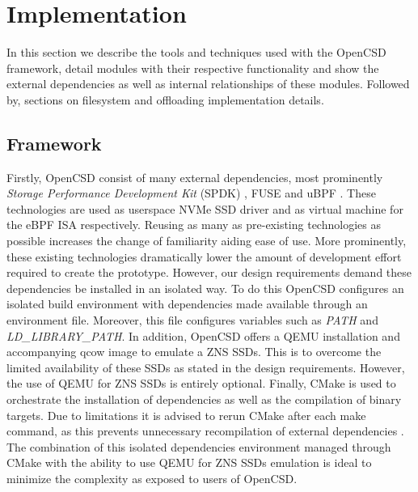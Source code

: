 
\chapter{Implementation} %


In this section we describe the tools and techniques used with the OpenCSD
framework, detail modules with their respective functionality and show the
external dependencies as well as internal relationships of these modules. 
Followed by, sections on filesystem and offloading implementation details.

\section{Framework}

\label{ease-of-use}

Firstly, OpenCSD consist of many external dependencies, most prominently
\textit{Storage Performance Development Kit} (SPDK) \cite{spdk},
FUSE \cite{fuse} and uBPF \cite{ubpf}. These technologies are used as userspace
NVMe SSD driver and as virtual machine for the eBPF ISA respectively. Reusing as
many as pre-existing technologies as possible increases the change of
familiarity aiding ease of use. More prominently, these existing technologies
dramatically lower the amount of development effort required to create the
prototype. However, our design requirements demand these dependencies be
installed in an isolated way. To do this OpenCSD configures an isolated build
environment with dependencies made available through an environment file.
Moreover, this file configures variables such as \textit{PATH} and
\textit{LD\_LIBRARY\_PATH}. In addition, OpenCSD offers a QEMU installation and
accompanying qcow image to emulate a ZNS SSDs. This is to overcome the limited
availability of these SSDs as stated in the design requirements. However, the
use of QEMU for ZNS SSDs is entirely optional. Finally, CMake \cite{cmake} is
used to orchestrate the installation of dependencies as well as the compilation
of binary targets. Due to limitations it is advised to rerun CMake after each
make command, as this  prevents unnecessary recompilation of external
dependencies \footnotemark[11]. The combination of this isolated dependencies
environment managed through CMake with the ability to use QEMU for ZNS SSDs
emulation is ideal to minimize the complexity as exposed to users of OpenCSD.

